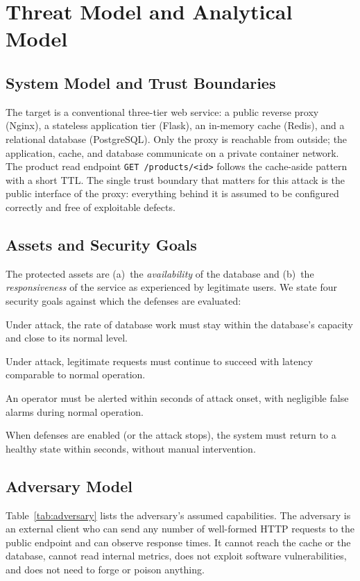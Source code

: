 \documentclass[preprint,12pt]{elsarticle}
\begin{document}
\section{Threat Model and Analytical Model}
\label{sec:threat}

\subsection{System Model and Trust Boundaries}
The target is a conventional three-tier web service: a public reverse proxy (Nginx),
a stateless application tier (Flask), an in-memory cache (Redis), and a relational
database (PostgreSQL). Only the proxy is reachable from outside; the application,
cache, and database communicate on a private container network. The product read
endpoint \texttt{GET /products/<id>} follows the cache-aside pattern with a short TTL.
The single trust boundary that matters for this attack is the public interface of
the proxy: everything behind it is assumed to be configured correctly and free of
exploitable defects.

\subsection{Assets and Security Goals}
The protected assets are (a)~the \emph{availability} of the database and (b)~the
\emph{responsiveness} of the service as experienced by legitimate users. We state four
security goals against which the defenses are evaluated:
\begin{description}[leftmargin=1.2em,style=nextline]
\item[G1 -- Database protection.] Under attack, the rate of database work must stay
within the database's capacity and close to its normal level.
\item[G2 -- User availability.] Under attack, legitimate requests must continue to
succeed with latency comparable to normal operation.
\item[G3 -- Timely detection.] An operator must be alerted within seconds of attack
onset, with negligible false alarms during normal operation.
\item[G4 -- Fast recovery.] When defenses are enabled (or the attack stops), the system
must return to a healthy state within seconds, without manual intervention.
\end{description}

\subsection{Adversary Model}
Table~\ref{tab:adversary} lists the adversary's assumed capabilities. The adversary is
an external client who can send any number of well-formed HTTP requests to the public
endpoint and can observe response times. It cannot reach the cache or the database,
cannot read internal metrics, does not exploit software vulnerabilities, and does not
need to forge or poison anything.
\end{document}
